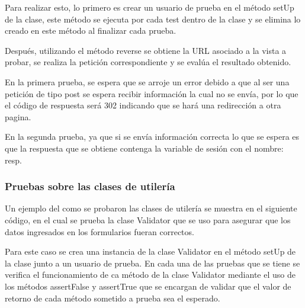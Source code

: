 Para realizar esto, lo primero es crear un usuario de prueba en el método setUp  de la clase, este método se ejecuta por cada test dentro de la clase y se elimina lo creado en este método al finalizar cada prueba.

Después, utilizando el método reverse se obtiene la URL asociado a la vista a probar, se realiza la petición correspondiente y se evalúa el resultado obtenido.



En la primera prueba, se espera que se arroje un error debido a que al ser una petición de tipo post se espera recibir información la cual no se envía, por lo que el código de respuesta será 302 indicando que se hará una redirección a otra pagina.

En la segunda prueba, ya que si se envía información correcta lo que se espera es que la respuesta que se obtiene contenga la variable de sesión con el nombre: resp.

\subsubsection{Pruebas sobre las clases de utilería}

Un ejemplo del como se probaron las clases de utilería se muestra en el siguiente código, en el cual se prueba la clase Validator que se uso para asegurar que los datos ingresados en los formularios fueran correctos.

Para este caso se crea una instancia de la clase Validator en el método setUp de la clase junto a un usuario de prueba. En cada una de las pruebas que se tiene se verifica el funcionamiento de ca método de la clase Validator mediante el uso de los métodos assertFalse y assertTrue que se encargan de validar que el valor de retorno de cada método sometido a prueba sea el esperado.


